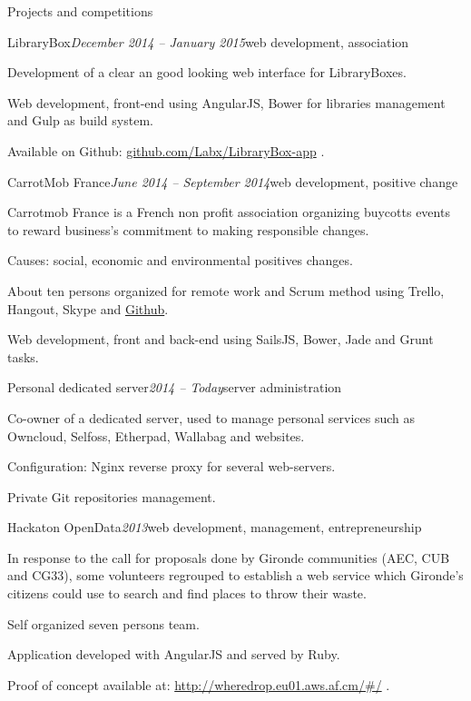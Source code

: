 \begin{rSection}{Projects and competitions}

  \begin{rSubsection}{LibraryBox}{\em December 2014 -- January 2015}{web development, association}{}
    \item[] Development of a clear an good looking web interface for LibraryBoxes.
    \item Web development, front-end using AngularJS, Bower for libraries management and Gulp as build system.
    \item Available on Github: \href{https://github.com/Labx/LibraryBox-app}{github.com/Labx/LibraryBox-app} .
  \end{rSubsection}

  \begin{rSubsection}{CarrotMob France}{\em June 2014 -- September 2014}{web development, positive change}{}
    \item[] Carrotmob France is a French non profit association organizing buycotts events to reward business's commitment to making responsible changes.
    \item Causes: social, economic and environmental positives changes.
    \item About ten persons organized for remote work and Scrum method using Trello, Hangout, Skype and \href{https://github.com/carrotcommunity/carrotmobfrance}{Github}.
    \item Web development, front and back-end using SailsJS, Bower, Jade and Grunt tasks.
  \end{rSubsection}

  \begin{rSubsection}{Personal dedicated server}{\em 2014 -- Today}{server administration}{}
    \item[] Co-owner of a dedicated server, used to manage personal services such as Owncloud, Selfoss, Etherpad, Wallabag and websites.
    \item Configuration: Nginx reverse proxy for several web-servers.
    \item Private Git repositories management.
  \end{rSubsection}

  \begin{rSubsection}{Hackaton OpenData}{\em 2013}{web development, management, entrepreneurship}{}
    \item[] In response to the call for proposals done by Gironde communities (AEC, CUB and CG33), some volunteers regrouped to establish a web service which Gironde's citizens could use to search and find places to throw their waste.
    \item Self organized seven persons team.
    \item Application developed with AngularJS and served by Ruby.
    \item Proof of concept available at: \href{http://wheredrop.eu01.aws.af.cm/#/}{http://wheredrop.eu01.aws.af.cm/\#/} .
  \end{rSubsection}


\end{rSection}
